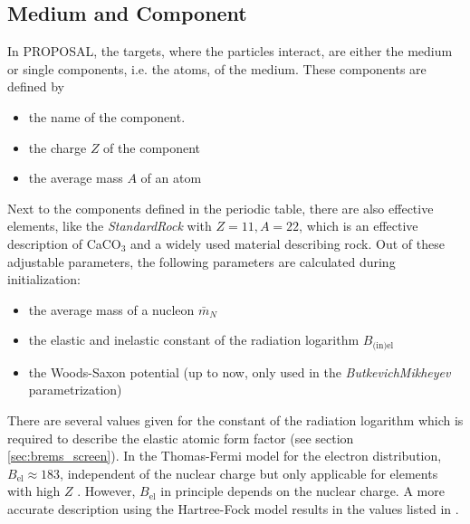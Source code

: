 %

\subsection{Medium and Component} \label{sec:medium}

In PROPOSAL, the targets, where the particles interact, are either the medium or single components, i.e. the atoms, of the medium.
These components are defined by 
\begin{itemize}
    \item the name of the component.
    \item the charge $Z$ of the component
    \item the average mass $A$ of an atom
\end{itemize}
Next to the components defined in the periodic table, there are also effective elements, like the \textit{StandardRock} with $Z=11, A=22$, which is an effective description of CaCO$_3$ and a widely used material describing rock.
Out of these adjustable parameters, the following parameters are calculated during initialization:
\begin{itemize}
    \item the average mass of a nucleon $\bar{m}_N$
    \item the elastic and inelastic constant of the radiation logarithm $B_{\text{(in)el}}$
    \item the Woods-Saxon potential (up to now, only used in the \textit{ButkevichMikheyev} parametrization)
\end{itemize}
There are several values given for the constant of the radiation logarithm which is required to describe the elastic atomic form factor (see section \ref{sec:brems_screen}).
In the Thomas-Fermi model for the electron distribution, $B_{\text{el}} \approx \num{183}$, independent of the nuclear charge but only applicable for elements with high $Z$ \cite{Bethe34a, Bethe34b}.
However, $B_{\text{el}}$ in principle depends on the nuclear charge.
A more accurate description using the Hartree-Fock model \cite{Kelner99RadLog} results in the values listed in .
